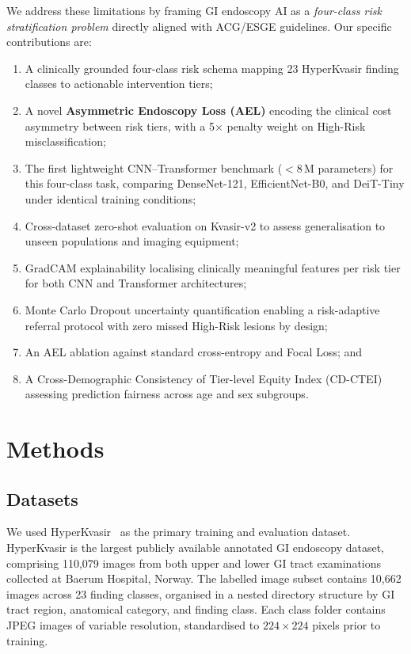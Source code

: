 \documentclass[10pt,a4paper,twocolumn]{article}
\begin{document}
We address these limitations by framing GI endoscopy AI as a \emph{four-class
risk stratification problem} directly aligned with ACG/ESGE guidelines. Our
specific contributions are:
\begin{enumerate}
  \item A clinically grounded four-class risk schema mapping 23 HyperKvasir
        finding classes to actionable intervention tiers;
  \item A novel \textbf{Asymmetric Endoscopy Loss (AEL)} encoding the clinical
        cost asymmetry between risk tiers, with a 5$\times$ penalty weight on
        High-Risk misclassification;
  \item The first lightweight CNN--Transformer benchmark ($<$8\,M parameters)
        for this four-class task, comparing DenseNet-121, EfficientNet-B0, and
        DeiT-Tiny under identical training conditions;
  \item Cross-dataset zero-shot evaluation on Kvasir-v2 to assess
        generalisation to unseen populations and imaging equipment;
  \item GradCAM explainability localising clinically meaningful features per
        risk tier for both CNN and Transformer architectures;
  \item Monte Carlo Dropout uncertainty quantification enabling a risk-adaptive
        referral protocol with zero missed High-Risk lesions by design;
  \item An AEL ablation against standard cross-entropy and Focal Loss; and
  \item A Cross-Demographic Consistency of Tier-level Equity Index (CD-CTEI)
        assessing prediction fairness across age and sex subgroups.
\end{enumerate}

\section{Methods}
\label{sec:methods}

\subsection{Datasets}
\label{sec:datasets}

We used HyperKvasir~\citep{Borgli2020} as the primary training and evaluation
dataset. HyperKvasir is the largest publicly available annotated GI endoscopy
dataset, comprising 110,079 images from both upper and lower GI tract
examinations collected at Baerum Hospital, Norway. The labelled image subset
contains 10,662 images across 23 finding classes, organised in a nested
directory structure by GI tract region, anatomical category, and finding
class. Each class folder contains JPEG images of variable resolution,
standardised to $224\times224$ pixels prior to training.
\end{document}
